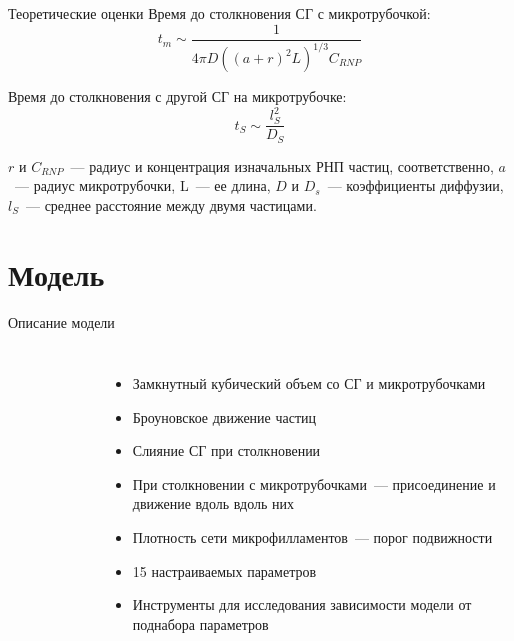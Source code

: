 \documentclass{beamer}
\begin{document}
\begin{frame}{Теоретические оценки}
Время до столкновения СГ с микротрубочкой:
\begin{equation}
t_m \sim \frac{1}{4 \pi D \left((a+r)^2 L \right)^{1/3} C_{RNP}}
\end{equation}

Время до столкновения с другой СГ на микротрубочке:
\begin{equation}
t_S \sim \frac{l_S^2}{D_S}
\end{equation}

{
\small
$r$ и $C_{RNP}$~--- радиус и концентрация изначальных РНП частиц, соответственно, $a$~--- радиус микротрубочки, L~--- ее длина, $D$ и $D_s$~--- коэффициенты диффузии, $l_S$~--- среднее расстояние между двумя частицами.
}
\end{frame}

\section{Модель}
\begin{frame}{Описание модели}
	\begin{columns}
		\begin{figure}
		\end{figure}

		\begin{itemize}
		\item Замкнутный кубический объем со СГ и микротрубочками
		\item Броуновское движение частиц
		\item Слияние СГ при столкновении
		\item При столкновении с микротрубочками~--- присоединение и движение вдоль вдоль них
		\item Плотность сети микрофилламентов~--- порог подвижности
		\item 15 настраиваемых параметров
		\item Инструменты для исследования зависимости модели от поднабора параметров
		\end{itemize}
	\end{columns}
\end{frame}

\end{document}
